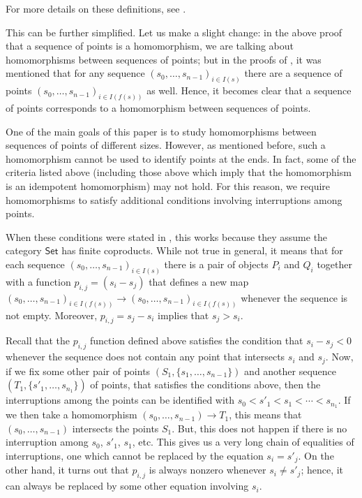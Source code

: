 \documentclass[a4paper,reqno,oneside]{article}
\begin{document}
For more details on these definitions, see \cite[Section 1.2.7]{johnson2009}.

This can be further simplified.  Let us make a slight change: in the above proof that a sequence of points is a homomorphism, we are talking about homomorphisms between sequences of points; but in the proofs of \cite[Section 1.2.7]{johnson2009}, it was mentioned that for any sequence $\left({s_0,\ldots,s_{n-1}}\right)_{i\in I(s)}$ there are a sequence of points $\left({s_0,\ldots,s_{n-1}}\right)_{i\in I(f(s))}$ as well.  Hence, it becomes clear that a sequence of points corresponds to a homomorphism between sequences of points.

One of the main goals of this paper is to study homomorphisms between sequences of points of different sizes.  However, as mentioned before, such a homomorphism cannot be used to identify points at the ends.  In fact, some of the criteria listed above (including those above which imply that the homomorphism is an idempotent homomorphism) may not hold.  For this reason, we require homomorphisms to satisfy additional conditions involving interruptions among points.

When these conditions were stated in \cite{johnson2009}, this works because they assume the category $\mathsf{Set}$ has finite coproducts.  While not true in general, it means that for each sequence $\left({s_0,\ldots,s_{n-1}}\right)_{i\in I(s)}$ there is a pair of objects $P_i$ and $Q_i$ together with a function $p_{i,j}=(s_i-s_j)$ that defines a new map $\left({s_0,\ldots,s_{n-1}}\right)_{i\in I(f(s))} \rightarrow \left({s_0,\ldots,s_{n-1}}\right)_{i\in I(f(s))}$ whenever the sequence is not empty.  Moreover, $p_{i,j} = s_j - s_i$ implies that $s_j>s_i$.

Recall that the $p_{i,j}$ function defined above satisfies the condition that $s_i-s_j <0$ whenever the sequence does not contain any point that intersects $s_i$ and $s_j$.   Now, if we fix some other pair of points $(S_1,\{s_1,\ldots,s_{n-1}\})$ and another sequence $(T_1,\{s'_1,\ldots,s_{n_1}\})$ of points, that satisfies the conditions above, then the interruptions among the points can be identified with $s_0<s'_1<s_1<\cdots<s_{n_1}$.  If we then take a homomorphism $\left({s_0,\ldots,s_{n-1}}\right) \rightarrow T_1$, this means that $\left({s_0,\ldots,s_{n-1}}\right)$ intersects the points $S_1$.  But, this does not happen if there is no interruption among $s_0$, $s'_1$, $s_1$, etc.  This gives us a very long chain of equalities of interruptions, one which cannot be replaced by the equation $s_i=s'_j$.  On the other hand, it turns out that $p_{i,j}$ is always nonzero whenever $s_i \not= s'_j$; hence, it can always be replaced by some other equation involving $s_i$.  
\end{document}

